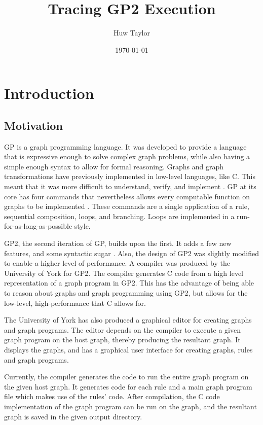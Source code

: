 \documentclass{UoYCSproject}
\author{Huw Taylor}
\title{Tracing GP2 Execution} %
\date{\today}
\begin{document}
\maketitle
\tableofcontents


\chapter{Introduction}
\section{Motivation}
GP is a graph programming language. It was developed to provide a language that is expressive enough to solve complex graph problems, while also having a simple enough syntax to allow for formal reasoning. Graphs and graph transformations have previously implemented in low-level languages, like C. This meant that it was more difficult to understand, verify, and implement \cite{gp_lang}. GP at its core has four commands that nevertheless allows every computable function on graphs to be implemented \cite{gp1}. These commands are a single application of a rule, sequential composition, loops, and branching. Loops are implemented in a run-for-as-long-as-possible style.

GP2, the second iteration of GP, builds upon the first. It adds a few new features, and some syntactic sugar \cite{gp2_design}. Also, the design of GP2 was slightly modified to enable a higher level of performance. A compiler was produced by the University of York for GP2. The compiler generates C code from a high level representation of a graph program in GP2. This has the advantage of being able to reason about graphs and graph programming using GP2, but allows for the low-level, high-performance that C allows for.

The University of York has also produced a graphical editor for creating graphs and graph programs. The editor depends on the compiler to execute a given graph program on the host graph, thereby producing the resultant graph. It displays the graphs, and has a graphical user interface for creating graphs, rules and graph programs.

Currently, the compiler generates the code to run the entire graph program on the given host graph. It generates code for each rule and a main graph program file which makes use of the rules' code. After compilation, the C code implementation of the graph program can be run on the graph, and the resultant graph is saved in the given output directory.
\end{document}
